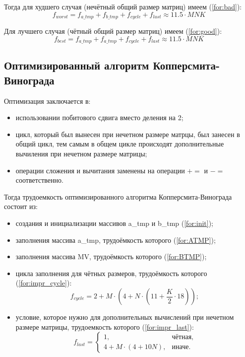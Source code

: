 Тогда для худшего случая (нечётный общий размер матриц) имеем (\ref{for:bad}):
\begin{equation}
	\label{for:bad}
	f_{worst} =  f_{a\_tmp} + f_{b\_tmp} + f_{cycle} + f_{last}\approx 11.5 \cdot MNK
\end{equation}

Для лучшего случая (чётный общий размер матриц) имеем (\ref{for:good}):
\begin{equation}
	\label{for:good}
f_{best} =  f_{a\_tmp} + f_{a\_tmp} + f_{cycle} + f_{last} \approx 11.5 \cdot MNK
\end{equation}


\subsection{Оптимизированный алгоритм Копперсмита-Винограда}

Оптимизация заключается в:
\begin{itemize}
    \item использовании побитового сдвига вместо деления на 2;
    \item цикл, который был вынесен при нечетном размере матрцы, был занесен в общий цикл, тем самым в общем цикле происходят дополнительные вычиления при нечетном размере матрицы;
    \item операции сложения и вычитания заменены на операции $+=$ и $-=$ соответственно. \newline
\end{itemize}

Тогда трудоемкость оптимизированного алгоритма Копперсмита-Винограда состоит из:

\begin{itemize}
	\item создания и инициализации массивов a\_tmp и b\_tmp (\ref{for:init});
	
	\item заполнения массива a\_tmp, трудоёмкость которого (\ref{for:ATMP});
	
	\item заполнения массива MV, трудоёмкость которого (\ref{for:BTMP});
	
	\item цикла заполнения для чётных размеров, трудоёмкость которого (\ref{for:impr_cycle}):
	\begin{equation}
		\label{for:impr_cycle}
		f_{cycle} =2 + M \cdot (4 + N \cdot (11 + \frac{K}{2} \cdot 18));
	\end{equation}
	
	\item условие, которое нужно для дополнительных вычислений при нечетном размере матрицы, трудоемкость которого (\ref{for:impr_last}):
	\begin{equation}
		\label{for:impr_last}
		f_{last} = 
		\begin{cases}
			1, & \text{чётная,}\\
			4 + M \cdot (4 + 10N), & \text{иначе.}
		\end{cases}
	\end{equation}
\end{itemize}

